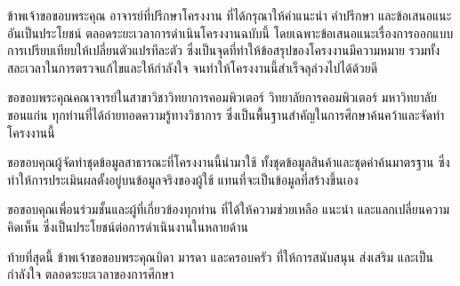 
ข้าพเจ้าขอขอบพระคุณ อาจารย์ที่ปรึกษาโครงงาน
ที่ได้กรุณาให้คำแนะนำ คำปรึกษา และข้อเสนอแนะอันเป็นประโยชน์
ตลอดระยะเวลาการดำเนินโครงงานฉบับนี้
โดยเฉพาะข้อเสนอแนะเรื่องการออกแบบการเปรียบเทียบให้เปลี่ยนตัวแปรทีละตัว
ซึ่งเป็นจุดที่ทำให้ข้อสรุปของโครงงานมีความหมาย
รวมทั้งสละเวลาในการตรวจแก้ไขและให้กำลังใจ
จนทำให้โครงงานนี้สำเร็จลุล่วงไปได้ด้วยดี

ขอขอบพระคุณคณาจารย์ในสาขาวิชาวิทยาการคอมพิวเตอร์
วิทยาลัยการคอมพิวเตอร์ มหาวิทยาลัยขอนแก่น
ทุกท่านที่ได้ถ่ายทอดความรู้ทางวิชาการ
ซึ่งเป็นพื้นฐานสำคัญในการศึกษาค้นคว้าและจัดทำโครงงานนี้

ขอขอบคุณผู้จัดทำชุดข้อมูลสาธารณะที่โครงงานนี้นำมาใช้
ทั้งชุดข้อมูลสินค้าและชุดคำค้นมาตรฐาน
ซึ่งทำให้การประเมินผลตั้งอยู่บนข้อมูลจริงของผู้ใช้
แทนที่จะเป็นข้อมูลที่สร้างขึ้นเอง

ขอขอบคุณเพื่อนร่วมชั้นและผู้ที่เกี่ยวข้องทุกท่าน
ที่ได้ให้ความช่วยเหลือ แนะนำ และแลกเปลี่ยนความคิดเห็น
ซึ่งเป็นประโยชน์ต่อการดำเนินงานในหลายด้าน

ท้ายที่สุดนี้ ข้าพเจ้าขอขอบพระคุณบิดา มารดา และครอบครัว
ที่ให้การสนับสนุน ส่งเสริม และเป็นกำลังใจ
ตลอดระยะเวลาของการศึกษา
